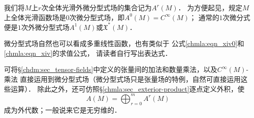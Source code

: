 我们将$M$上$r$次全体光滑外微分型式场的集合记为$A^r(M)$．
为方便起见，规定$M$上全体光滑函数场是$0$次微分型式场，即$A^0(M)=C^\infty(M)$；
通常的$1$次微分式便是$1$次外微分型式场$A^1(M)$或$\mathfrak{X}^{*}(M)$．

微分型式场自然也可以看成多重线性函数，也有类似于
公式\eqref{chmla:eqn_xiv0}和\eqref{chmla:eqn_xiv}的求值公式，
请读者自行写出表达式．

可将\S \ref{chdm:sec_tensor-fields}中定义的张量间的加法和数量乘法，以及$C^\infty(M)$-乘法
直接运用到微分型式场（微分型式场只是张量场的特例，自然可直接运用这些运算）．
除此之外，还可仿照\S \ref{chmla:sec_exterior-product}逐点定义外积，使
\begin{equation}
    A(M)= \bigoplus_{r=0}^{m} A^r(M)
\end{equation}
成为{\heiti 外代数}；一般说来它是无穷维的．


